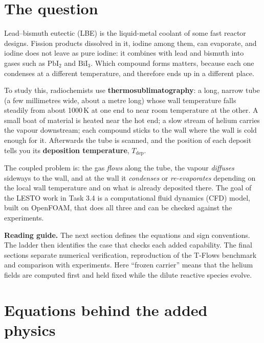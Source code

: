 \documentclass[10pt,a4paper]{article}
\newcommand{\PbI}{\ensuremath{\mathrm{PbI}_2}}
\newcommand{\BiI}{\ensuremath{\mathrm{BiI}_3}}
\newcommand{\Tdep}{\ensuremath{T_\mathrm{dep}}}
\begin{document}
\section{The question}

Lead--bismuth eutectic (LBE) is the liquid-metal coolant of some fast reactor
designs. Fission products dissolved in it, iodine among them, can evaporate,
and iodine does not leave as pure iodine: it combines with lead and bismuth
into gases such as \PbI{} and \BiI{}. Which compound forms matters, because
each one condenses at a different temperature, and therefore ends up in a
different place.

To study this, radiochemists use \textbf{thermosublimatography}: a long,
narrow tube (a few millimetres wide, about a metre long) whose wall
temperature falls steadily from about 1000\,K at one end to near room
temperature at the other. A small boat of material is heated near the hot
end; a slow stream of helium carries the vapour downstream; each compound
sticks to the wall where the wall is cold enough for it. Afterwards the tube
is scanned, and the position of each deposit tells you its
\textbf{deposition temperature}, \Tdep{}.

The coupled problem is: the gas
\emph{flows} along the tube, the vapour \emph{diffuses} sideways to the wall,
and at the wall it \emph{condenses} or \emph{re-evaporates} depending on the
local wall temperature and on what is already deposited there. The goal of
the LESTO work in Task 3.4 is a computational fluid dynamics (CFD) model,
built on OpenFOAM, that does all three and can be checked against the
experiments.

\begin{jargon}
\textbf{Reading guide.} The next section defines the equations and sign
conventions. The ladder then identifies the case that checks each added
capability. The final sections separate numerical verification,
reproduction of the T-Flows benchmark and comparison with experiments.
Here ``frozen carrier'' means that the helium fields are computed first
and held fixed while the dilute reactive species evolve.
\end{jargon}


\clearpage
\section{Equations behind the added physics}
\end{document}
